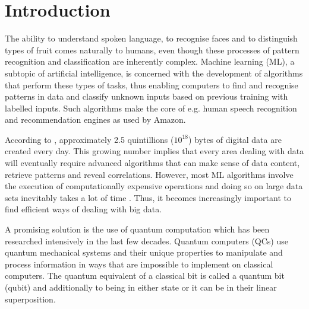 \chapter{Introduction}\label{sec:introduction}

The ability to understand spoken language, to recognise faces and to distinguish types of fruit comes naturally to humans, even though these processes of pattern recognition and classification are inherently complex. Machine learning (ML), a subtopic of artificial intelligence, is concerned with the development of algorithms that perform these types of tasks, thus enabling computers to find and recognise patterns in data and classify unknown inputs based on previous training with labelled inputs. Such algorithms make the core of e.g. human speech recognition and recommendation engines as used by Amazon.

According to , approximately 2.5 quintillions (${10}^{18}$) bytes of digital data are created every day. This growing number implies that every area dealing with data will eventually require advanced algorithms that can make sense of data content, retrieve patterns and reveal correlations. However, most ML algorithms involve the execution of computationally expensive operations and doing so on large data sets inevitably takes a lot of time \cite{bekkerman2011scaling}. Thus, it becomes increasingly important to find efficient ways of dealing with big data.

A promising solution is the use of quantum computation which has been researched intensively in the last few decades. Quantum computers (QCs) use quantum mechanical systems and their unique properties to manipulate and process information in ways that are impossible to implement on classical computers. The quantum equivalent of a classical bit is called a quantum bit (qubit) and additionally to being in either state \0 or \1 it can be in their linear superposition.


